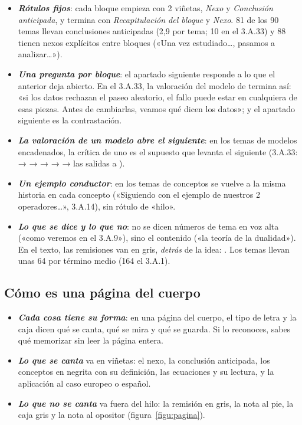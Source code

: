 \documentclass[11pt]{article}
\begin{document}
\begin{itemize}
\item \textbf{\emph{Rótulos fijos}}: cada bloque empieza con 2 viñetas, \emph{Nexo} y \emph{Conclusión anticipada}, y termina con \emph{Recapitulación del bloque} y \emph{Nexo}. 81 de los 90 temas llevan conclusiones anticipadas (2,9 por tema; 10 en el 3.A.33) y 88 tienen nexos explícitos entre bloques («Una vez estudiado…, pasamos a analizar…»).
\item \textbf{\emph{Una pregunta por bloque}}: el apartado siguiente responde a lo que el anterior deja abierto. En el 3.A.33, la valoración del modelo de  termina así: «si los datos rechazan el paseo aleatorio, el fallo puede estar en cualquiera de esas piezas. Antes de cambiarlas, veamos qué dicen los datos»; y el apartado siguiente es la contrastación.
\item \textbf{\emph{La valoración de un modelo abre el siguiente}}: en los temas de modelos encadenados, la crítica de uno es el supuesto que levanta el siguiente (3.A.33:  →  →  →  →  → las salidas a ).
\item \textbf{\emph{Un ejemplo conductor}}: en los temas de conceptos se vuelve a la misma historia en cada concepto («Siguiendo con el ejemplo de nuestros 2 operadores…», 3.A.14), sin rótulo de «hilo».
\item \textbf{\emph{Lo que se dice y lo que no}}: no se dicen números de tema en voz alta («como veremos en el 3.A.9»), sino el contenido («la teoría de la dualidad»). En el texto, las remisiones van en gris, \emph{detrás} de la idea: . Los temas llevan unas 64 por término medio (164 el 3.A.1).
\end{itemize}

\subsection{Cómo es una página del cuerpo}\label{sec:pagina}

\begin{itemize}
\item \textbf{\emph{Cada cosa tiene su forma}}: en una página del cuerpo, el tipo de letra y la caja dicen qué se canta, qué se mira y qué se guarda. Si lo reconoces, sabes qué memorizar sin leer la página entera.
\item \textbf{\emph{Lo que se canta}} va en viñetas: el nexo, la conclusión anticipada, los conceptos en negrita con su definición, las ecuaciones y su lectura, y la aplicación al caso europeo o español.
\item \textbf{\emph{Lo que no se canta}} va fuera del hilo: la remisión en gris, la nota al pie, la caja gris y la nota al opositor (figura~\ref{figu:pagina}).
\end{itemize}
\end{document}
